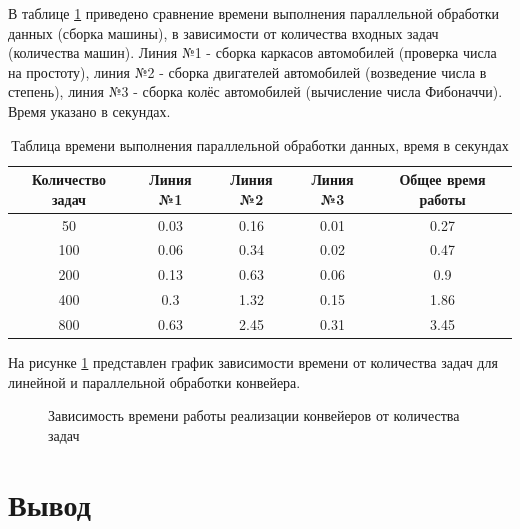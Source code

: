 \documentclass[12pt]{report}
\begin{document}
В таблице \ref{tab01} приведено сравнение времени выполнения параллельной обработки данных (сборка машины), в зависимости от количества входных задач (количества машин). Линия №1 - сборка каркасов автомобилей (проверка числа на простоту), линия №2 - сборка двигателей автомобилей (возведение числа в степень), линия №3 - сборка колёс автомобилей (вычисление числа Фибоначчи). Время указано в секундах.

\begin{table} [h!]
	\caption{Таблица времени выполнения параллельной обработки данных, время в секундах}
	\label{tab01}
	\begin{center}
		\begin{tabular}{|c c c c c|} 
		 	\hline
			Количество задач & Линия №1 & Линия №2 & Линия №3 & Общее время работы  \\  
		 	\hline
		 	50 & 0.03 & 0.16 & 0.01 & 0.27 \\
		 	\hline
		 	100 & 0.06 & 0.34 & 0.02 & 0.47 \\
		 	\hline
		 	200 & 0.13 & 0.63 & 0.06 & 0.9 \\
		 	\hline
			400 & 0.3 & 1.32 & 0.15 & 1.86 \\
			\hline
			800 & 0.63  & 2.45 & 0.31 & 3.45 \\
			\hline
		\end{tabular}
	\end{center}
\end{table}



На рисунке \ref{plt:linear-vs-parallel} представлен график зависимости времени от количества задач для линейной и параллельной обработки конвейера.


\begin{figure}[H]
	\centering
	\captionsetup{justification=centering}
	\caption{Зависимость времени работы реализации конвейеров от количества задач}
	\label{plt:linear-vs-parallel}
\end{figure}

\section*{Вывод}
\end{document}
